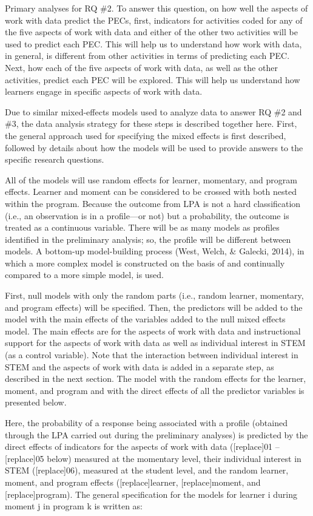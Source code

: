 \documentclass[]{book}
\theoremstyle{definition}
\theoremstyle{definition}
\theoremstyle{definition}
\theoremstyle{remark}
\begin{document}
Primary analyses for RQ \#2. To answer this question, on how well the
aspects of work with data predict the PECs, first, indicators for
activities coded for any of the five aspects of work with data and
either of the other two activities will be used to predict each PEC.
This will help us to understand how work with data, in general, is
different from other activities in terms of predicting each PEC. Next,
how each of the five aspects of work with data, as well as the other
activities, predict each PEC will be explored. This will help us
understand how learners engage in specific aspects of work with data.

Due to similar mixed-effects models used to analyze data to answer RQ
\#2 and \#3, the data analysis strategy for these steps is described
together here. First, the general approach used for specifying the mixed
effects is first described, followed by details about how the models
will be used to provide answers to the specific research questions.

All of the models will use random effects for learner, momentary, and
program effects. Learner and moment can be considered to be crossed with
both nested within the program. Because the outcome from LPA is not a
hard classification (i.e., an observation is in a profile---or not) but
a probability, the outcome is treated as a continuous variable. There
will be as many models as profiles identified in the preliminary
analysis; so, the profile will be different between models. A bottom-up
model-building process (West, Welch, \& Galecki, 2014), in which a more
complex model is constructed on the basis of and continually compared to
a more simple model, is used.

First, null models with only the random parts (i.e., random learner,
momentary, and program effects) will be specified. Then, the predictors
will be added to the model with the main effects of the variables added
to the null mixed effects model. The main effects are for the aspects of
work with data and instructional support for the aspects of work with
data as well as individual interest in STEM (as a control variable).
Note that the interaction between individual interest in STEM and the
aspects of work with data is added in a separate step, as described in
the next section. The model with the random effects for the learner,
moment, and program and with the direct effects of all the predictor
variables is presented below.

Here, the probability of a response being associated with a profile
(obtained through the LPA carried out during the preliminary analyses)
is predicted by the direct effects of indicators for the aspects of work
with data ({[}replace{]}01 -- {[}replace{]}05 below) measured at the
momentary level, their individual interest in STEM ({[}replace{]}06),
measured at the student level, and the random learner, moment, and
program effects ({[}replace{]}learner, {[}replace{]}moment, and
{[}replace{]}program). The general specification for the models for
learner i during moment j in program k is written as:
\end{document}
